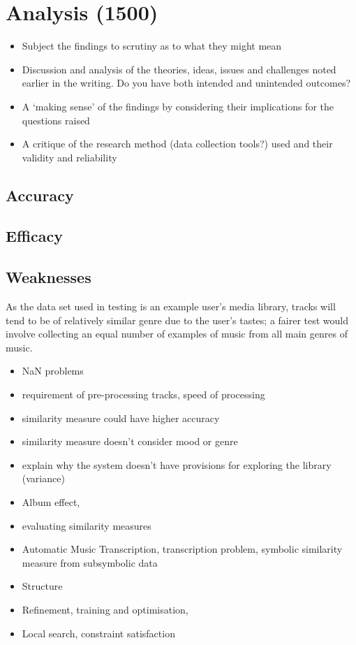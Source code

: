 \chapter{Analysis (1500)}
\begin{itemize}
	\item Subject the findings to scrutiny as to what they might mean
	\item Discussion and analysis of the theories, ideas, issues and challenges noted earlier in the writing. Do you have both intended and unintended outcomes?
	\item A `making sense' of the findings by considering their implications for the questions raised
	\item A critique of the research method (data collection tools?) used and their validity and reliability
\end{itemize}
\section{Accuracy}
\section{Efficacy}
\section{Weaknesses}
As the data set used in testing is an example user's media library, tracks will tend to be of relatively similar genre due to the user's tastes; a fairer test would involve collecting an equal number of examples of music from all main genres of music.
\begin{itemize}
	\item NaN problems
	\item requirement of pre-processing tracks, speed of processing
	\item similarity measure could have higher accuracy
	\item similarity measure doesn't consider mood or genre
	\item explain why the system doesn't have provisions for exploring the library (variance)
\end{itemize}
\begin{itemize}
	\item Album effect, \citet*{Kim2006}
	\item evaluating similarity measures \citet*{Aucouturier2004}
	\item Automatic Music Transcription, transcription problem, symbolic similarity measure from subsymbolic data \citet*{Aucouturier2004}
	\item Structure \citet*{Bruderer2006}
	\item Refinement, training and optimisation, \citet*{Bruderer2006}
	\item Local search, constraint satisfaction \citet*{Vossen2005}
\end{itemize}
